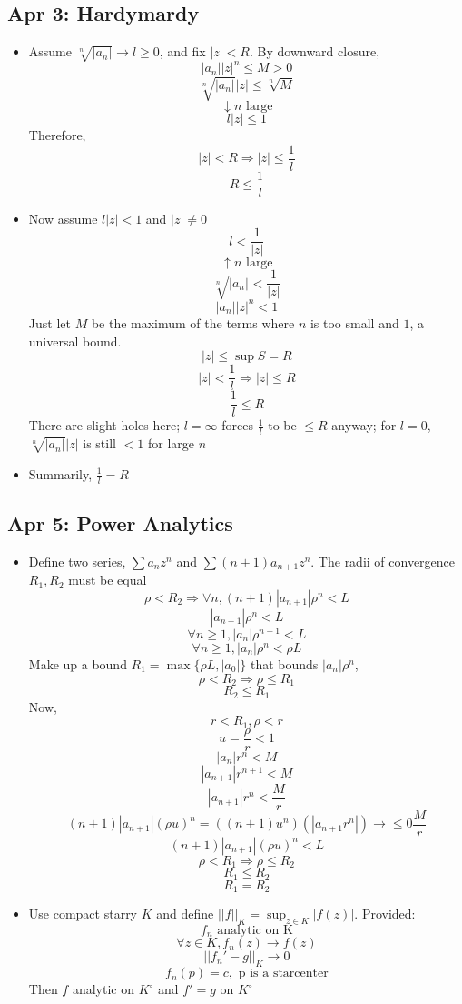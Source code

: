 \documentclass[10pt, oneside]{article}
\let\leq\leqslant
\let\geq\geqslant
\begin{document}
\subsection{Apr 3: Hardymardy}
\begin{itemize}
    \item Assume $\sqrt[n]{|a_n|} \rightarrow l \geq 0$, and fix $|z| < R$. By downward closure, 
            \[|a_n||z|^n \leq M > 0\]
            \[\sqrt[n]{|a_n|}|z| \leq \sqrt[n]{M}\]
            \[\downarrow n \text{ large}\]
            \[l |z| \leq 1\]
        Therefore,
            \[|z| < R \Rightarrow |z| \leq \frac{1}{l}\]
            \[R \leq \frac{1}{l}\]
    \item Now assume $l|z| < 1$ and $|z| \neq 0$
            \[l < \frac{1}{|z|}\]
            \[\uparrow n \text{ large}\]
            \[\sqrt[n]{|a_n|} < \frac{1}{|z|}\]
            \[|a_n||z|^n < 1\]
        Just let $M$ be the maximum of the terms where $n$ is too small and $1$, a universal bound.
            \[|z| \leq \sup S = R\]
            \[|z| < \frac{1}{l} \Rightarrow |z| \leq R\]
            \[\frac{1}{l} \leq R\]
        There are slight holes here; $l = \infty$ forces $\frac{1}{l}$ to be $\leq R$ anyway; for $l = 0$, $\sqrt[n]{|a_n|}|z|$ is still $< 1$ for large $n$
    \item Summarily, $\frac{1}{l} = R$
\end{itemize} 

\subsection{Apr 5: Power Analytics}
\begin{itemize}
    \item Define two series, $\sum a_n z^n$ and $\sum (n+1) a_{n+1} z^n$. The radii of convergence $R_1, R_2$ must be equal
            \[\rho < R_2 \Rightarrow \forall n, (n+1)|a_{n+1}|\rho^n < L\]
            \[|a_{n+1}|\rho^n < L\]
            \[\forall n \geq 1, |a_n|\rho^{n-1} < L\]
            \[\forall n \geq 1, |a_n|\rho^n < \rho L\]
        Make up a bound $R_1 = \max\{\rho L,|a_0|\}$ that bounds $|a_n|\rho^n$,
            \[\rho < R_2 \Rightarrow \rho \leq R_1\]
            \[R_2 \leq R_1\]
        Now,
            \[r < R_1, \rho < r\]
            \[u = \frac{\rho}{r} < 1\]
            \[|a_n|r^n < M\]
            \[|a_{n+1}|r^{n+1} < M\]
            \[|a_{n+1}|r^n < \frac{M}{r}\]
            \[(n+1)|a_{n+1}|(\rho u)^n = ((n+1)u^n)(|a_{n+1}r^n|) \rightarrow \leq 0 \frac{M}{r}\]
            \[(n+1)|a_{n+1}|(\rho u)^n < L\]
            \[\rho < R_1 \Rightarrow \rho \leq R_2\]
            \[R_1 \leq R_2\]
            \[R_1 = R_2\]
    \item Use compact starry $K$ and define $||f||_K = \displaystyle \sup_{z \in K} |f(z)|$. Provided:
            \[f_n \text{ analytic on K}\]
            \[\forall z \in K, f_n(z) \rightarrow f(z)\]
            \[||f_n' - g||_K \rightarrow 0\]
            \[f_n(p) = c, \text{ p is a starcenter}\]
        Then $f$ analytic on $K^\circ$ and $f' = g$ on $K^\circ$
\end{itemize}
\end{document}
